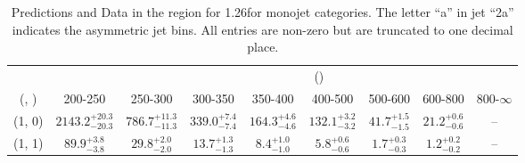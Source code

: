 \begin{table}[h!]
\tiny
\centering
\caption{Predictions and Data in the \mj region for 1.26\ifb for monojet categories. The letter ``a'' in jet \eg ``2a''  indicates the asymmetric jet bins. All entries are non-zero but are truncated to one decimal place.\label{tab:yieldsnodatapost_mu_comb_mono}}
\begin{tabular}
{ccccccccc}
	\hline\hline
&	& \multicolumn{8}{c}{\scalht (\gev)} \\ 
	 (\njet,  \nb) & 200-250 & 250-300 & 300-350 & 350-400 & 400-500 & 500-600 & 600-800 & 800-$\infty$ \\ [0.8ex] 
\hline
	(1, 0) & $2143.2^{+ 20.3 }_{- 20.3 }$ & $786.7^{+ 11.3 }_{- 11.3 }$ & $339.0^{+ 7.4 }_{- 7.4 }$ & $164.3^{+ 4.6 }_{- 4.6 }$ & $132.1^{+ 3.2 }_{- 3.2 }$ & $41.7^{+ 1.5 }_{- 1.5 }$ & $21.2^{+ 0.6 }_{- 0.6 }$ & -- \\[0.5ex] 
	(1, 1) & $89.9^{+ 3.8 }_{- 3.8 }$ & $29.8^{+ 2.0 }_{- 2.0 }$ & $13.7^{+ 1.3 }_{- 1.3 }$ & $8.4^{+ 1.0 }_{- 1.0 }$ & $5.8^{+ 0.6 }_{- 0.6 }$ & $1.7^{+ 0.3 }_{- 0.3 }$ & $1.2^{+ 0.2 }_{- 0.2 }$ & -- \\[0.5ex] 
	\hline
	\hline
\end{tabular}
\end{table}
